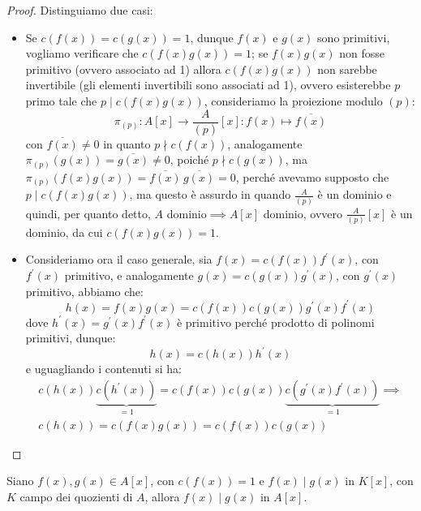 \documentclass[11pt]{scrartcl}
\begin{document}
\begin{proof}
    Distinguiamo due casi:
    \begin{itemize}
        \item Se $c(f(x)) = c(g(x)) = 1$, dunque $f(x)$ e $g(x)$ sono primitivi, vogliamo verificare che $c(f(x)g(x)) = 1$; se $f(x)g(x)$ non fosse primitivo (ovvero associato ad 1)
            allora $c(f(x)g(x))$ non sarebbe invertibile (gli elementi invertibili sono associati ad 1), ovvero esisterebbe $p$ primo tale che $p \mid c(f(x)g(x))$, consideriamo la proiezione modulo $(p)$:
            \[ \pi_{(p)} : A[x] \longrightarrow \frac{A}{(p)}[x] : f(x) \longmapsto \overline{f(x)}
                \]
            con $\overline{f(x)} \ne 0$ in quanto $p \nmid c(f(x))$, analogamente $\pi_{(p)}(g(x)) = \overline{g(x)} \ne 0$, poiché $p \nmid c(g(x))$, ma $\pi_{(p)}(f(x)g(x)) = \overline{f(x)}\,\overline{g(x)} = 0$, 
            perché avevamo supposto che $p \mid c(f(x)g(x))$, ma questo è assurdo in quando $\displaystyle \frac{A}{(p)}$ è un dominio e quindi, per quanto detto, $A$ dominio$\implies A[x]$ dominio, ovvero $\displaystyle \frac{A}{(p)} [x]$
            è un dominio, da cui $c(f(x)g(x)) = 1$.
        \item Consideriamo ora il caso generale, sia $f(x) = c(f(x))f^{\prime}(x)$, con $f^{\prime}(x)$ primitivo, e analogamente $g(x) = c(g(x))g^{\prime}(x)$, con $g^{\prime}(x)$ primitivo, abbiamo che:
            \[ h(x) = f(x)g(x) = c(f(x))c(g(x))g^{\prime}(x)f^{\prime}(x)
                \]
            dove $h^{\prime}(x) = g^{\prime}(x)f^{\prime}(x)$ è primitivo perché prodotto di polinomi primitivi, dunque:
            \[ h(x) = c(h(x))h^{\prime}(x)
                \]
            e uguagliando i contenuti si ha:
            \begin{multline*}
                c(h(x))\underbrace{c(h^{\prime}(x))}_{= 1} = c(f(x))c(g(x))\underbrace{c(g^{\prime}(x)f^{\prime}(x))}_{= 1} \implies \\
                c(h(x)) = c(f(x)g(x)) = c(f(x))c(g(x))
            \end{multline*}
    \end{itemize}
\end{proof}

\begin{corollary}
    \label{2.118}
    Siano $f(x),g(x) \in A[x]$, con $c(f(x)) = 1$ e $f(x) \mid g(x)$ in $K[x]$, con $K$ campo dei quozienti di $A$, allora $f(x) \mid g(x)$ in $A[x]$.
\end{corollary}
\end{document}
